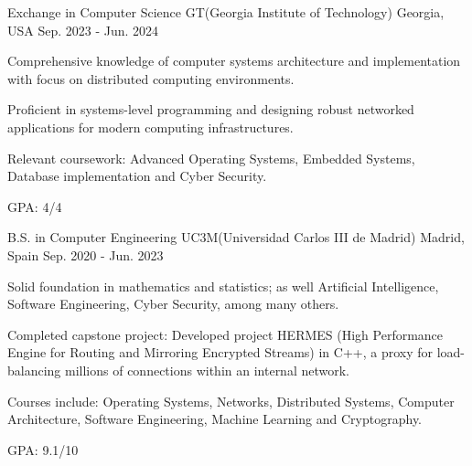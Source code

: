\begin{cventries}
    \cventry
    {Exchange in Computer Science} %
    {GT(Georgia Institute of Technology)} %
    {Georgia, USA} %
    {Sep. 2023 - Jun. 2024} %
    {
      \begin{cvitems} %
      \item {Comprehensive knowledge of computer systems architecture and implementation with focus on distributed computing environments.}
      \item {Proficient in systems-level programming and designing robust networked applications for modern computing infrastructures.}
      \item {Relevant coursework: Advanced Operating Systems, Embedded Systems, Database implementation and Cyber Security.}
      \item {GPA: 4/4}
      \end{cvitems}
    }
    \cventry
    {B.S. in Computer Engineering} %
    {UC3M(Universidad Carlos III de Madrid)} %
    {Madrid, Spain} %
    {Sep. 2020 - Jun. 2023} %
    {
      \begin{cvitems} %
      \item {Solid foundation in mathematics and statistics; as well Artificial Intelligence, Software Engineering, Cyber Security, among many others.}
      \item {Completed capstone project: Developed project HERMES (High Performance Engine for Routing and Mirroring Encrypted Streams) in C++, a proxy for load-balancing millions of connections within an internal network.}
      \item {Courses include: Operating Systems, Networks, Distributed Systems, Computer Architecture, Software Engineering, Machine Learning and Cryptography.}
      \item {GPA: 9.1/10}
      \end{cvitems}
    }


  \end{cventries}
